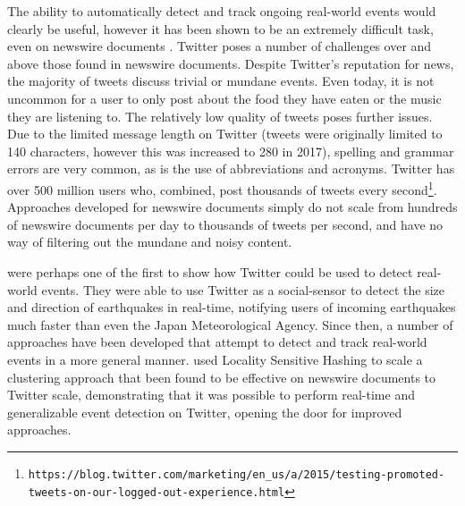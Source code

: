 The ability to automatically detect and track ongoing real-world events would clearly be useful, however it has been shown to be an extremely difficult task, even on newswire documents \citep{Allan:2000:FSD:354756.354843}.
Twitter poses a number of challenges over and above those found in newswire documents.
Despite Twitter's reputation for news, the majority of tweets discuss trivial or mundane events.
Even today, it is not uncommon for a user to only post about the food they have eaten or the music they are listening to.
The relatively low quality of tweets poses further issues.
Due to the limited message length on Twitter (tweets were originally limited to 140 characters, however this was increased to 280 in 2017), spelling and grammar errors are very common, as is the use of abbreviations and acronyms.
Twitter has over 500 million users who, combined, post thousands of tweets every second\footnote{\texttt{https://blog.twitter.com/marketing/en\_us/a/2015/testing-promoted-\\tweets-on-our-logged-out-experience.html}}.
Approaches developed for newswire documents simply do not scale from hundreds of newswire documents per day to thousands of tweets per second, and have no way of filtering out the mundane and noisy content.

\cite{Sakaki:2010:EST:1772690.1772777} were perhaps one of the first to show how Twitter could be used to detect real-world events.
They were able to use Twitter as a social-sensor to detect the size and direction of earthquakes in real-time, notifying users of incoming earthquakes much faster than even the Japan Meteorological Agency.
Since then, a number of approaches have been developed that attempt to detect and track real-world events in a more general manner.
\cite{Petrovic10} used Locality Sensitive Hashing to scale a clustering approach that been found to be effective on newswire documents to Twitter scale, demonstrating that it was possible to perform real-time and generalizable event detection on Twitter, opening the door for improved approaches.

